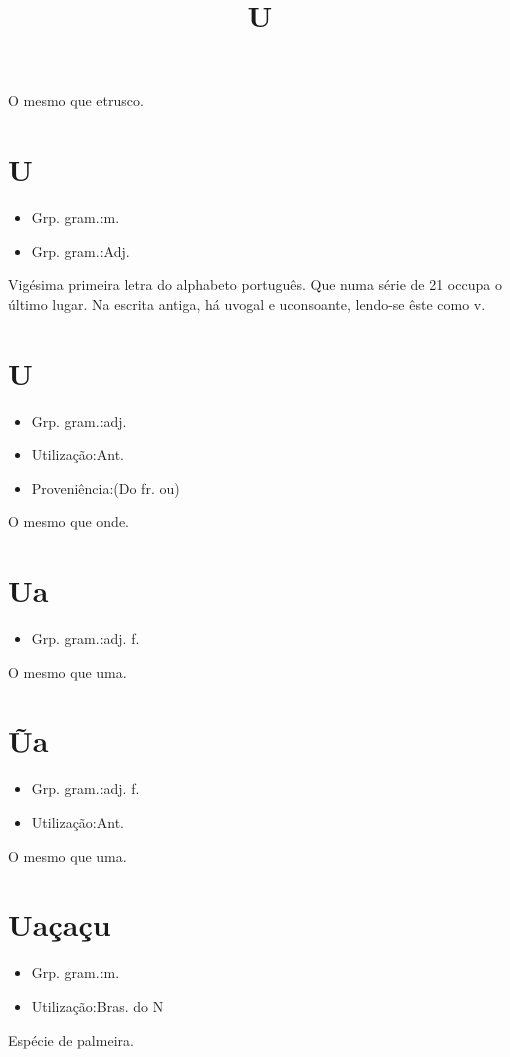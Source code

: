 \documentclass{article}
\title{U}
\begin{document}
O mesmo que \textunderscore etrusco\textunderscore .
\section{U}
\begin{itemize}
\item {Grp. gram.:m.}
\end{itemize}
\begin{itemize}
\item {Grp. gram.:Adj.}
\end{itemize}
Vigésima primeira letra do alphabeto português.
Que numa série de 21 occupa o último lugar.
Na escrita antiga, há \textunderscore u\textunderscore  vogal e \textunderscore u\textunderscore  consoante, lendo-se êste como \textunderscore v\textunderscore .
\section{U}
\begin{itemize}
\item {Grp. gram.:adj.}
\end{itemize}
\begin{itemize}
\item {Utilização:Ant.}
\end{itemize}
\begin{itemize}
\item {Proveniência:(Do fr. \textunderscore ou\textunderscore )}
\end{itemize}
O mesmo que \textunderscore onde\textunderscore .
\section{Ua}
\begin{itemize}
\item {Grp. gram.:adj. f.}
\end{itemize}
O mesmo que \textunderscore uma\textunderscore .
\section{Ũa}
\begin{itemize}
\item {Grp. gram.:adj. f.}
\end{itemize}
\begin{itemize}
\item {Utilização:Ant.}
\end{itemize}
O mesmo que \textunderscore uma\textunderscore .
\section{Uaçaçu}
\begin{itemize}
\item {Grp. gram.:m.}
\end{itemize}
\begin{itemize}
\item {Utilização:Bras. do N}
\end{itemize}
Espécie de palmeira.
\end{document}
